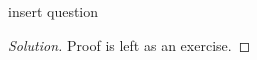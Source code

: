 \begin{solution}{4.1}
    \begin{question}[]
        insert question    
    \end{question}
    \tcblower{}
    \begin{proof}[Solution]
        Proof is left as an exercise.
    \end{proof}
\end{solution}